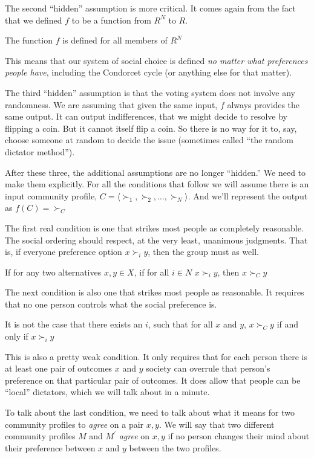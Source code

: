 The second ``hidden'' assumption is more critical. It comes again from the fact that we defined $f$ to be a function from $R^N$ to $R$.
\begin{definition}
The function $f$ is defined for all members of $R^N$
\end{definition}
This means that our system of social choice is defined {\it no matter what preferences people have}, including the Condorcet cycle (or anything else for that matter).  

The third ``hidden'' assumption is that the voting system does not involve any randomness.  We are assuming that given the same input, $f$ always provides the same output.  It can output indifferences, that we might decide to resolve by flipping a coin.  But it cannot itself flip a coin.  So there is no way for it to, say, choose someone at random to decide the issue (sometimes called ``the random dictator method'').

After these three, the additional assumptions are no longer ``hidden.'' We need to make them explicitly.  For all the conditions that follow we will assume there is an input community profile, $C = \langle \succ_1, \succ_2, \dots, \succ_N\rangle$.  And we'll represent the output as $f(C) = \succ_C$

The first real condition is one that strikes most people as completely reasonable. The social ordering should respect, at the very least, unanimous judgments.  That is, if everyone preference option $x \succ_i y$, then the group must as well.
\begin{definition}
If for any two alternatives $x, y \in X$, if for all $i\in N$ $x \succ_i y$, then $x \succ_C y$
\end{definition}

The next condition is also one that strikes most people as reasonable.  It requires that no one person controls what the social preference is.  
\begin{definition}
It is not the case that there exists an $i$, such that for all $x$ and $y$, $x \succ_C y$ if and only if $x \succ_i y$
\end{definition}
This is also a pretty weak condition. It only requires that for each person there is at least one pair of outcomes $x$ and $y$ society can overrule that person's preference on that particular pair of outcomes. It does  allow that people can be ``local'' dictators, which we will talk about in a minute.

To talk about the last condition, we need to talk about what it means for two community profiles to {\it agree} on a pair $x, y$.  We will say that two different community profiles $M$ and $M^\prime$ {\it agree} on $x, y$ if no person changes their mind about their preference between $x$ and $y$ between the two profiles.  

